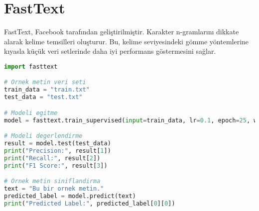 \section{FastText}
FastText, Facebook tarafından geliştirilmiştir. Karakter n-gramlarını dikkate alarak kelime temsilleri oluşturur. Bu, kelime seviyesindeki gömme yöntemlerine kıyasla küçük veri setlerinde daha iyi performans göstermesini sağlar. 

\begin{lstlisting}[language=Python]
import fasttext

# Ornek metin veri seti
train_data = "train.txt"
test_data = "test.txt"

# Modeli egitme
model = fasttext.train_supervised(input=train_data, lr=0.1, epoch=25, wordNgrams=2)

# Modeli degerlendirme
result = model.test(test_data)
print("Precision:", result[1])
print("Recall:", result[2])
print("F1 Score:", result[3])

# Ornek metin siniflandirma
text = "Bu bir ornek metin."
predicted_label = model.predict(text)
print("Predicted Label:", predicted_label[0][0])
\end{lstlisting}

\newpage